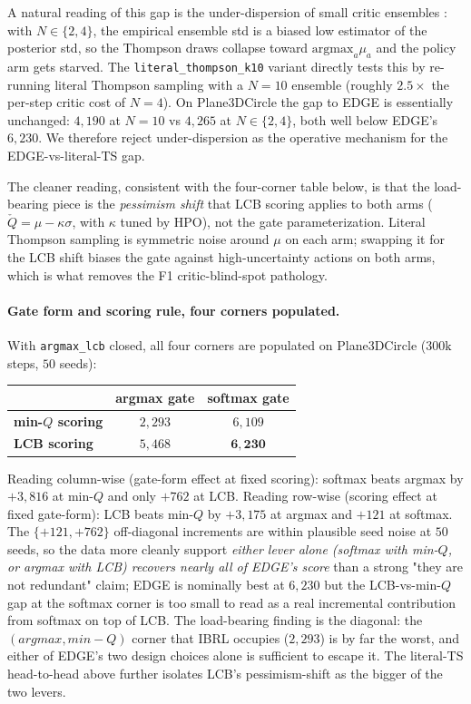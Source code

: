 \documentclass{article}
\begin{document}
A natural reading of this gap is the under-dispersion of small
critic ensembles
\citep{osband2016bootstrappeddqn,an2021edac,ghasemipour2022msg}: with
$N\!\in\!\{2,4\}$, the empirical ensemble std is a biased low
estimator of the posterior std, so the Thompson draws collapse
toward $\mathrm{argmax}_a \mu_a$ and the policy arm gets starved.
The \texttt{literal\_thompson\_k10} variant directly tests this by
re-running literal Thompson sampling with a $N{=}10$ ensemble
(roughly $2.5\times$ the per-step critic cost of $N{=}4$). On
Plane3DCircle the gap to EDGE is essentially unchanged: $4{,}190$ at
$N{=}10$ vs $4{,}265$ at $N{\in}\{2,4\}$, both well below EDGE's
$6{,}230$. We therefore reject under-dispersion as the operative
mechanism for the EDGE-vs-literal-TS gap.

The cleaner reading, consistent with the four-corner table below,
is that the load-bearing piece is the \emph{pessimism shift}
that LCB scoring applies to both arms ($\check Q = \mu - \kappa
\sigma$, with $\kappa$ tuned by HPO), not the gate parameterization.
Literal Thompson sampling is symmetric noise around $\mu$ on each
arm; swapping it for the LCB shift biases the gate against
high-uncertainty actions on both arms, which is what removes the F1
critic-blind-spot pathology.

\paragraph{Gate form and scoring rule, four corners populated.}
With \texttt{argmax\_lcb} closed, all four corners are populated on
Plane3DCircle ($300\mathrm{k}$ steps, $50$ seeds):
\begin{center}
\small
\begin{tabular}{lcc}
\toprule
& \textbf{argmax gate} & \textbf{softmax gate} \\
\midrule
\textbf{min-$Q$ scoring}   & $2{,}293$ & $6{,}109$ \\
\textbf{LCB scoring}       & $5{,}468$ & $\mathbf{6{,}230}$ \\
\bottomrule
\end{tabular}
\end{center}
Reading column-wise (gate-form effect at fixed scoring): softmax
beats argmax by $+3{,}816$ at min-$Q$ and only $+762$ at LCB.
Reading row-wise (scoring effect at fixed gate-form): LCB beats
min-$Q$ by $+3{,}175$ at argmax and $+121$ at softmax. The
$\{+121, +762\}$ off-diagonal increments are within plausible seed
noise at $50$ seeds, so the data more cleanly support \emph{either
lever alone (softmax with min-$Q$, or argmax with LCB) recovers
nearly all of EDGE's score} than a strong "they are not redundant"
claim; EDGE is nominally best at $6{,}230$ but the LCB-vs-min-$Q$
gap at the softmax corner is too small to read as a real
incremental contribution from softmax on top of LCB. The
load-bearing finding is the diagonal: the $(argmax, min-Q)$ corner
that IBRL occupies ($2{,}293$) is by far the worst, and either of
EDGE's two design choices alone is sufficient to escape it. The
literal-TS head-to-head above further isolates LCB's
pessimism-shift as the bigger of the two levers.
\end{document}
